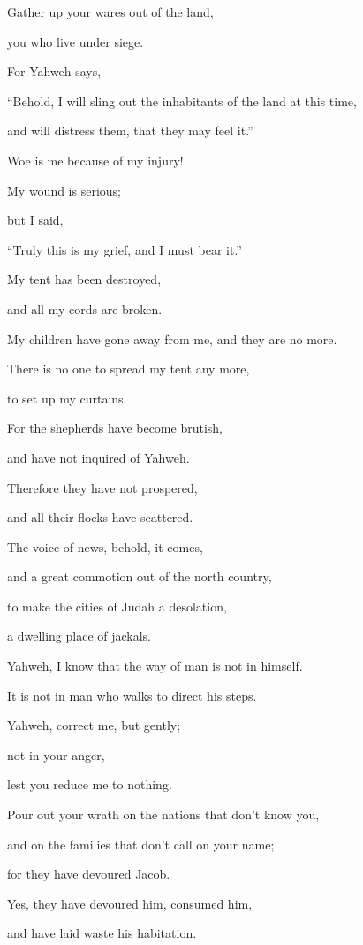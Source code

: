 {\par }{\Q {}Gather up your wares out of the land,
\par }{\QB you who live under siege.
\par }{\Q {}For Yahweh says,
\par }{\QB “Behold, I will sling out the inhabitants of the land at this time,
\par }{\QB and will distress them, that they may feel it.”
\par }{\Q {}Woe is me because of my injury!
\par }{\QB My wound is serious;
\par }{\Q but I said,
\par }{\QB “Truly this is my grief, and I must bear it.”
\par }{\Q {}My tent has been destroyed,
\par }{\QB and all my cords are broken.
\par }{\Q My children have gone away from me, and they are no more.
\par }{\QB There is no one to spread my tent any more,
\par }{\QB to set up my curtains.
\par }{\Q {}For the shepherds have become brutish,
\par }{\QB and have not inquired of Yahweh.
\par }{\Q Therefore they have not prospered,
\par }{\QB and all their flocks have scattered.
\par }{\Q {}The voice of news, behold, it comes,
\par }{\QB and a great commotion out of the north country,
\par }{\Q to make the cities of Judah a desolation,
\par }{\QB a dwelling place of jackals.
\par }{\Q {}Yahweh, I know that the way of man is not in himself.
\par }{\QB It is not in man who walks to direct his steps.
\par }{\Q {}Yahweh, correct me, but gently;
\par }{\QB not in your anger,
\par }{\QB lest you reduce me to nothing.
\par }{\Q {}Pour out your wrath on the nations that don’t know you,
\par }{\QB and on the families that don’t call on your name;
\par }{\Q for they have devoured Jacob.
\par }{\QB Yes, they have devoured him, consumed him,
\par }{\QB and have laid waste his habitation.

}
